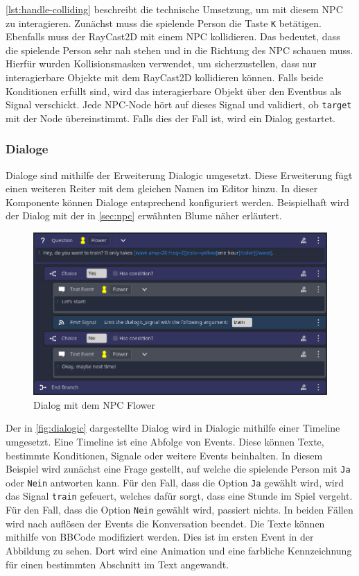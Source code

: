 \autoref{lst:handle-colliding} beschreibt die technische Umsetzung, um mit diesem \ac{NPC} zu interagieren.
Zunächst muss die spielende Person die Taste \texttt{K} betätigen. Ebenfalls muss der RayCast2D mit einem \ac{NPC} kollidieren. Das bedeutet, dass die spielende Person sehr nah stehen und in die Richtung des \ac{NPC} schauen muss. Hierfür wurden Kollisionsmasken verwendet, um sicherzustellen, dass nur interagierbare Objekte mit dem RayCast2D kollidieren können. Falls beide Konditionen erfüllt sind, wird das interagierbare Objekt über den Eventbus als Signal verschickt. Jede \ac{NPC}-Node hört auf dieses Signal und validiert, ob \texttt{target} mit der Node übereinstimmt. Falls dies der Fall ist, wird ein Dialog gestartet.

\subsubsection{Dialoge}
Dialoge sind mithilfe der Erweiterung Dialogic umgesetzt\cite{github-dialogic}. Diese Erweiterung fügt einen weiteren Reiter mit dem gleichen Namen im Editor hinzu. In dieser Komponente können Dialoge entsprechend konfiguriert werden. Beispielhaft wird der Dialog mit der in \autoref{sec:npc} erwähnten Blume näher erläutert.\\

\begin{figure}[H]
\centering
\includegraphics[width=0.9\columnwidth]{figures/screenshots/dialogic.png}
\caption{\label{fig:dialogic}Dialog mit dem \ac{NPC} Flower}
\end{figure}

Der in \autoref{fig:dialogic} dargestellte Dialog wird in Dialogic mithilfe einer Timeline umgesetzt. Eine Timeline ist eine Abfolge von Events. Diese können Texte, bestimmte Konditionen, Signale oder weitere Events beinhalten. In diesem Beispiel wird zunächst eine Frage gestellt, auf welche die spielende Person mit \texttt{Ja} oder \texttt{Nein} antworten kann. Für den Fall, dass die Option \texttt{Ja} gewählt wird, wird das Signal \texttt{train} gefeuert, welches dafür sorgt, dass eine Stunde im Spiel vergeht. Für den Fall, dass die Option \texttt{Nein} gewählt wird, passiert nichts. In beiden Fällen wird nach auflösen der Events die Konversation beendet. Die Texte können mithilfe von BBCode modifiziert werden. Dies ist im ersten Event in der Abbildung zu sehen. Dort wird eine Animation und eine farbliche Kennzeichnung für einen bestimmten Abschnitt im Text angewandt. 

